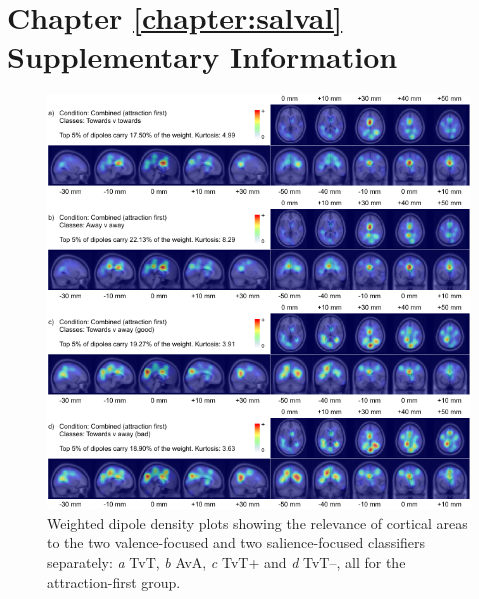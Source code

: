 
\chapter*{Chapter \ref{chapter:salval} Supplementary Information}

\vfill

\begin{figure}[h]
    \renewcommand\thefigure{\ref{chapter:salval}.S1}
    \centering
    \includegraphics[width=\textwidth]{figures/salval-posfirst-wdd-combined-separate.pdf}
    \caption[Weighted dipole density plots for the two valence-focused and salience focused-classifiers separately, for the attraction-first group.]{Weighted dipole density plots showing the relevance of cortical areas to the two valence-focused and two salience-focused classifiers separately: \emph{a} TvT, \emph{b} AvA, \emph{c} TvT+ and \emph{d} TvT--, all for the attraction-first group.}
    \label{fig:posfirst-wdd-combined-separate}
\end{figure}

\vfill\null\clearpage

\null\vspace{55pt}

\vfill

